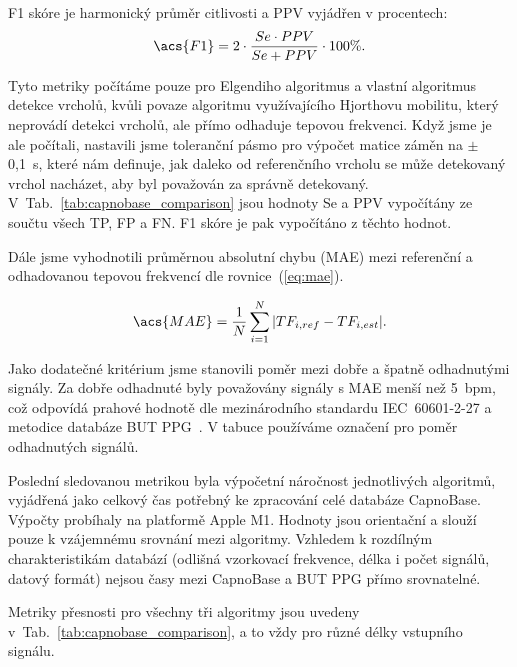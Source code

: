 \acs{F1} skóre je harmonický průměr citlivosti a \acs{PPV} vyjádřen v procentech:
\begin{equation}
	\label{eq:f1}
	\acs{F1} = 2 \cdot \frac{Se \cdot PPV}{Se + PPV} \cdot 100\%.
\end{equation}

Tyto metriky počítáme pouze pro Elgendiho algoritmus a vlastní algoritmus detekce vrcholů, kvůli povaze algoritmu využívajícího Hjorthovu mobilitu, který neprovádí detekci vrcholů, ale přímo odhaduje tepovou frekvenci.
Když jsme je ale počítali, nastavili jsme toleranční pásmo pro výpočet matice záměn na $\pm$0,1~\acs{s}, které nám definuje, jak daleko od referenčního vrcholu se může detekovaný vrchol nacházet, aby byl považován za správně detekovaný.
V~Tab.~\ref{tab:capnobase_comparison} jsou hodnoty \acs{Se} a \acs{PPV} vypočítány ze součtu všech \acs{TP}, \acs{FP} a \acs{FN}.
\acs{F1} skóre je pak vypočítáno z těchto hodnot.

Dále jsme vyhodnotili průměrnou absolutní chybu (\acs{MAE}) mezi referenční a odhadovanou tepovou frekvencí dle rovnice~(\ref{eq:mae}).

\begin{equation}
	\label{eq:mae}
	\acs{MAE} = \frac{1}{N} \sum_{i=1}^{N} |TF_{i,ref} - TF_{i,est}|.
\end{equation}

Jako dodatečné kritérium jsme stanovili poměr mezi dobře a špatně odhadnutými signály.
Za dobře odhadnuté byly považovány signály s \acs{MAE} menší než 5~\acs{bpm}, což odpovídá prahové hodnotě dle mezinárodního standardu IEC~60601-2-27 a metodice databáze \acs{BUT PPG}~\cite{BUT_PPG}.
V tabuce používáme označení  pro poměr  odhadnutých signálů.

Poslední sledovanou metrikou byla výpočetní náročnost jednotlivých algoritmů, vyjádřená jako celkový čas potřebný ke zpracování celé databáze CapnoBase.
Výpočty probíhaly na platformě Apple M1.
Hodnoty jsou orientační a slouží pouze k vzájemnému srovnání mezi algoritmy.
Vzhledem k rozdílným charakteristikám databází (odlišná vzorkovací frekvence, délka i počet signálů, datový formát) nejsou časy mezi CapnoBase a \acs{BUT PPG} přímo srovnatelné.

Metriky přesnosti pro všechny tři algoritmy jsou uvedeny v~Tab.~\ref{tab:capnobase_comparison}, a to vždy pro různé délky vstupního signálu.

